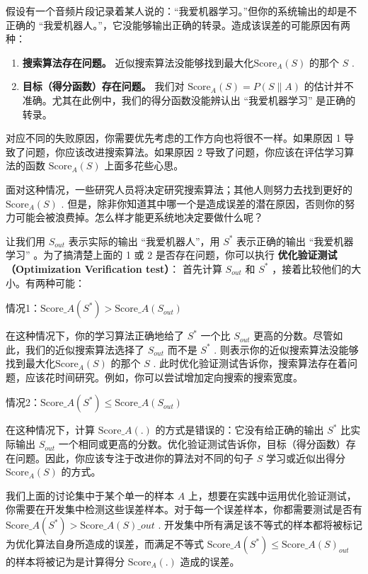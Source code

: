 假设有一个音频片段记录着某人说的：``我爱机器学习。''但你的系统输出的却是不正确的
``我爱机器人。''，它没能够输出正确的转录。造成该误差的可能原因有两种：

\begin{enumerate}
\def\labelenumi{\arabic{enumi}.}
\tightlist
\item
  \textbf{搜索算法存在问题。}
  近似搜索算法没能够找到最大化\(\text{Score}_A(S)\) 的那个 \(S\) .
\item
  \textbf{目标（得分函数）存在问题。} 我们对
  \(\text{Score}_A (S)=P(S\|A)\)
  的估计并不准确。尤其在此例中，我们的得分函数没能辨认出
  ``我爱机器学习'' 是正确的转录。
\end{enumerate}

对应不同的失败原因，你需要优先考虑的工作方向也将很不一样。如果原因 1
导致了问题，你应该改进搜索算法。如果原因 2
导致了问题，你应该在评估学习算法的函数 \(\text{Score}_A(S)\)
上面多花些心思。

面对这种情况，一些研究人员将决定研究搜索算法；其他人则努力去找到更好的
\(\text{Score}_A(S)\) .
但是，除非你知道其中哪一个是造成误差的潜在原因，否则你的努力可能会被浪费掉。怎么样才能更系统地决定要做什么呢？

让我们用 \(S_{out}\) 表示实际的输出 ``我爱机器人''，用 \(S^*\)
表示正确的输出 ``我爱机器学习'' 。为了搞清楚上面的 1 或 2
是否存在问题，你可以执行 \textbf{优化验证测试（Optimization Verification
test）}： 首先计算 \(S_{out}\) 和 \(S^*\)
，接着比较他们的大小。有两种可能：

情况1：\(\text{Score}\_A {(S^*)} \gt \text{Score}\_A {(S_{out})}\)

在这种情况下，你的学习算法正确地给了 \(S^*\) 一个比 \(S_{out}\)
更高的分数。尽管如此，我们的近似搜索算法选择了 \(S_{out}\) 而不是
\(S^*\) . 则表示你的近似搜索算法没能够找到最大化\(\text{Score}_A(S)\)
的那个 \(S\) .
此时优化验证测试告诉你，搜索算法存在着问题，应该花时间研究。例如，你可以尝试增加定向搜索的搜索宽度。

情况2：\(\text{Score}\_A (S^*) \leq \text{Score}\_A (S_{out})\)

在这种情况下，计算 \(\text{Score}\_A (.)\)
的方式是错误的：它没有给正确的输出 \(S^*\) 比实际输出 \(S_{out}\)
一个相同或更高的分数。优化验证测试告诉你，目标（得分函数）存在问题。因此，你应该专注于改进你的算法对不同的句子
\(S\) 学习或近似出得分 \(\text{Score}_A (S)\) 的方式。

我们上面的讨论集中于某个单一的样本 \(A\)
上，想要在实践中运用优化验证测试，你需要在开发集中检测这些误差样本。对于每一个误差样本，你都需要测试是否有
\(\text{Score}\_A (S^*) \gt \text{Score}\_A (S)\_{out}\) .
开发集中所有满足该不等式的样本都将被标记为优化算法自身所造成的误差，而满足不等式
\(\text{Score}\_A (S^*) \leq \text{Score}\_A (S)_{out}\)
的样本将被记为是计算得分 \(\text{Score}_A (.)\) 造成的误差。

